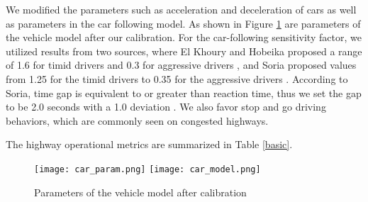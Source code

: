 \documentclass{article}
\begin{document}
We modified the parameters such as acceleration and deceleration of cars as well as parameters in the car following model. As shown in Figure \ref{fig:car_param} are parameters of the vehicle model after our calibration. For the car-following sensitivity factor, we utilized results from two sources, where El Khoury and Hobeika proposed a range of 1.6 for timid drivers and 0.3 for aggressive drivers \cite{El}, and Soria proposed values from 1.25 for the timid drivers to 0.35 for the aggressive drivers \cite{Soria}. According to Soria, time gap is equivalent to or greater than reaction time, thus we set the gap to be 2.0 seconds with a 1.0 deviation \cite{hdm}. We also favor stop and go driving behaviors, which are commonly seen on congested highways.

The highway operational metrics are summarized in Table \ref{basic}.

\begin{figure}[!htbp]
    \centering
    \texttt{[image: car\_param.png]}
    \texttt{[image: car\_model.png]}
    \caption{Parameters of the vehicle model after calibration}
    \label{fig:car_param}
\end{figure}

\end{document}
